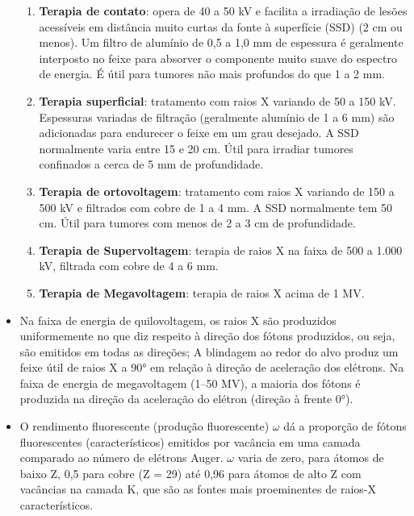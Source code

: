 \documentclass[11pt,a4paper]{article}
\newcounter{exemplo}
\begin{document}
\begin{exemplo}
\begin{itemize}
\begin{enumerate}[label=\alph*)]
				\item \textbf{Terapia de contato}: opera de 40 a 50 kV e facilita a irradiação de lesões acessíveis em distância muito curtas da fonte à superfície (SSD) (2 cm ou menos). Um filtro de alumínio de 0,5 a 1,0 mm de espessura é geralmente interposto no feixe para absorver o componente muito suave do espectro de energia. É útil para tumores não mais profundos do que 1 a 2 mm.
				
				\item \textbf{Terapia superficial}: tratamento com raios X variando de 50 a 150 kV. Espessuras variadas de filtração (geralmente alumínio de 1 a 6 mm) são adicionadas para endurecer o feixe em um grau desejado. A SSD normalmente varia entre 15 e 20 cm. Útil para irradiar tumores confinados a cerca de 5 mm de profundidade.
				
				\item \textbf{Terapia de ortovoltagem}: tratamento com raios X variando de 150 a 500 kV e filtrados com cobre de 1 a 4 mm. A SSD normalmente tem 50 cm. Útil para tumores com menos de 2 a 3 cm de profundidade.
				
				\item \textbf{Terapia de Supervoltagem}: terapia de raios X na faixa de 500 a 1.000 kV, filtrada com cobre de 4 a 6 mm.
				
				\item \textbf{Terapia de Megavoltagem}: terapia de raios X acima de 1 MV.
			\end{enumerate}

		\item Na faixa de energia de quilovoltagem, os raios X são produzidos uniformemente no que diz respeito à direção dos fótons produzidos, ou seja, são emitidos em todas as direções; A blindagem ao redor do alvo produz um feixe útil de raios X a 90° em relação à direção de aceleração dos elétrons. Na faixa de energia de megavoltagem (1–50 MV), a maioria dos fótons é produzida na direção da aceleração do elétron (direção  à frente 0°).
		
		\item O rendimento fluorescente (produção fluorescente) $\omega$ dá a proporção de fótons fluorescentes (característicos) emitidos por vacância em uma camada comparado ao número de elétrons Auger. $\omega$ varia de zero, para átomos de baixo Z,  0,5 para cobre (Z = 29) até 0,96 para átomos de alto Z com vacâncias  na camada K, que são as fontes mais proeminentes de raios-X característicos.
		

\end{itemize}
\end{exemplo}
\end{document}
